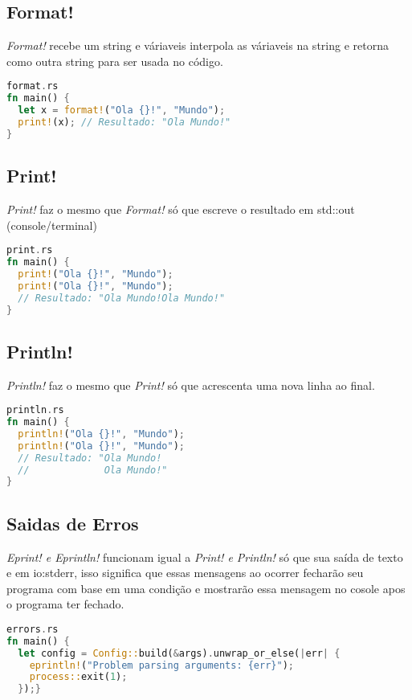 \subsection{Format!}

\textit{Format!} recebe um string e váriaveis interpola as váriaveis na string e retorna como outra string para ser usada no código.


\begin{lstlisting}[language=rust]
format.rs
fn main() {
  let x = format!("Ola {}!", "Mundo");
  print!(x); // Resultado: "Ola Mundo!"
}
\end{lstlisting}

\subsection{Print!}

\textit{Print!} faz o mesmo que \textit{Format!} só que escreve o resultado em std::out (console/terminal) 

\begin{lstlisting}[language=rust]
print.rs
fn main() {
  print!("Ola {}!", "Mundo");
  print!("Ola {}!", "Mundo"); 
  // Resultado: "Ola Mundo!Ola Mundo!"
}
\end{lstlisting}

\subsection{Println!}

\textit{Println!} faz o mesmo que \textit{Print!} só que acrescenta uma nova linha ao final.

\begin{lstlisting}[language=rust]
println.rs
fn main() {
  println!("Ola {}!", "Mundo");
  println!("Ola {}!", "Mundo");
  // Resultado: "Ola Mundo!
  //             Ola Mundo!"
}
\end{lstlisting}

\subsection{Saidas de Erros}

\textit{Eprint! e Eprintln!} funcionam igual a \textit{Print! e Println!} só que sua saída de texto e em io:stderr, isso significa que essas mensagens ao ocorrer fecharão seu programa com base em uma condição e mostrarão essa mensagem no cosole apos o programa ter fechado.

\begin{lstlisting}[language=rust]
errors.rs
fn main() {
  let config = Config::build(&args).unwrap_or_else(|err| {
    eprintln!("Problem parsing arguments: {err}");
    process::exit(1);
  });}
\end{lstlisting}

